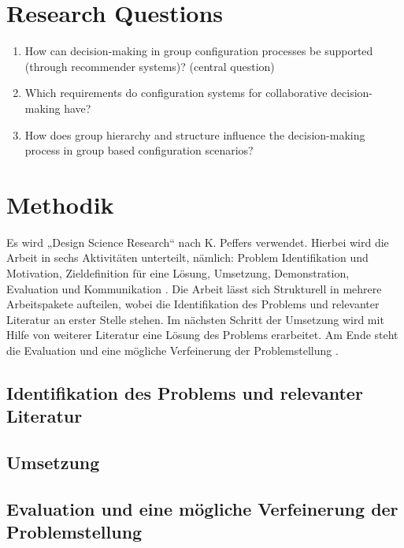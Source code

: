 \documentclass{article}
\begin{document}
\section{Research Questions}

\begin{enumerate}
    \item How can decision-making in group configuration processes be supported (through recommender systems)? (central question)
    \item Which requirements do configuration systems for collaborative decision-making have?
    \item How does group hierarchy and structure influence the decision-making process in group based configuration scenarios?
\end{enumerate}

\section{Methodik}

Es wird „Design Science Research“ nach K. Peffers verwendet. Hierbei wird die Arbeit in sechs Aktivitäten unterteilt, nämlich: Problem Identifikation und Motivation, Zieldefinition für eine Lösung, Umsetzung, Demonstration, Evaluation und  Kommunikation \cite{peffersDesignScienceResearch2007}. Die Arbeit lässt sich Strukturell in mehrere Arbeitspakete aufteilen, wobei die Identifikation des Problems und relevanter Literatur an erster Stelle stehen. Im nächsten Schritt der Umsetzung wird mit Hilfe von weiterer Literatur eine Lösung des Problems erarbeitet. Am Ende steht die Evaluation und eine mögliche Verfeinerung der Problemstellung \cite{offermannOutlineDesignScience2009}.

\subsection{Identifikation des Problems und relevanter Literatur}

\subsection{Umsetzung}

\subsection{Evaluation und eine mögliche Verfeinerung der Problemstellung}

\printbibliography[heading=bibintoc]
\end{document}
